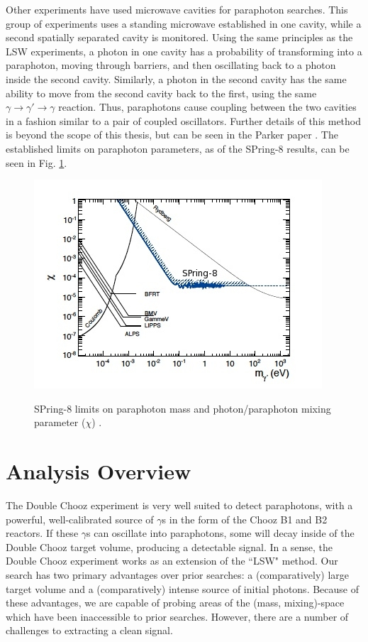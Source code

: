   Other experiments have used microwave cavities \cite{Parker:2013fba} for paraphoton searches. This group of experiments uses a standing microwave established in one cavity, while a second spatially separated cavity is monitored. Using the same principles as the LSW experiments, a photon in one cavity has a probability of transforming into a paraphoton, moving through barriers, and then oscillating back to a photon inside the second cavity.  Similarly, a photon in the second cavity has the same ability to move from the second cavity back to the first, using the same $ \gamma \rightarrow \gamma \prime \rightarrow \gamma$ reaction. Thus, paraphotons cause coupling between the two cavities in a fashion similar to a pair of coupled oscillators. Further details of this method is beyond the scope of this thesis, but can be seen in the Parker paper \cite{Parker:2013fba}. The established limits on paraphoton parameters, as of the SPring-8 results, can be seen in Fig. \ref{Limits}.
 
 \begin{figure}
 \caption{SPring-8 limits on paraphoton mass and photon/paraphoton mixing parameter ($\chi$)  \cite{2013PhLB..722..301I}.}
 \includegraphics[width=.5 \textwidth]{Paraphotons/Spring_Limits_edit.jpg}
 \label{Limits}
 \end{figure}


\section{Analysis Overview}
The Double Chooz experiment is very well suited to detect paraphotons, with a powerful, well-calibrated source of $\gamma$s in the form of the Chooz B1 and B2 reactors. If these $\gamma$s can oscillate into paraphotons, some will decay inside of the Double Chooz target volume, producing a detectable signal. In a sense, the Double Chooz experiment works as an extension of the ``LSW" method. Our search has two primary advantages over prior searches: a (comparatively) large target volume and a (comparatively) intense source of initial photons. Because of these advantages, we are capable of probing areas of the (mass, mixing)-space which have been inaccessible to prior searches. However, there are a number of challenges to extracting a clean signal. 


